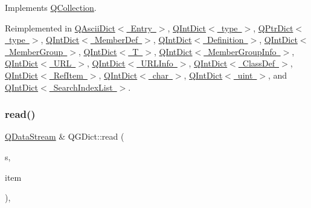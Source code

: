 Implements \mbox{\hyperlink{class_q_collection_a6441adbfb3ffb6f55ed834c0c0bcc6cb}{Q\+Collection}}.



Reimplemented in \mbox{\hyperlink{class_q_ascii_dict_a2241b13419dc0fcb6da3bcd159219404}{Q\+Ascii\+Dict$<$ Entry $>$}}, \mbox{\hyperlink{class_q_int_dict_acba9c2286ecaab46e0231e145ef5e471}{Q\+Int\+Dict$<$ type $>$}}, \mbox{\hyperlink{class_q_ptr_dict_a05675b8aa91387dd5cbb74eb881e17d1}{Q\+Ptr\+Dict$<$ type $>$}}, \mbox{\hyperlink{class_q_int_dict_acba9c2286ecaab46e0231e145ef5e471}{Q\+Int\+Dict$<$ Member\+Def $>$}}, \mbox{\hyperlink{class_q_int_dict_acba9c2286ecaab46e0231e145ef5e471}{Q\+Int\+Dict$<$ Definition $>$}}, \mbox{\hyperlink{class_q_int_dict_acba9c2286ecaab46e0231e145ef5e471}{Q\+Int\+Dict$<$ Member\+Group $>$}}, \mbox{\hyperlink{class_q_int_dict_acba9c2286ecaab46e0231e145ef5e471}{Q\+Int\+Dict$<$ T $>$}}, \mbox{\hyperlink{class_q_int_dict_acba9c2286ecaab46e0231e145ef5e471}{Q\+Int\+Dict$<$ Member\+Group\+Info $>$}}, \mbox{\hyperlink{class_q_int_dict_acba9c2286ecaab46e0231e145ef5e471}{Q\+Int\+Dict$<$ U\+R\+L $>$}}, \mbox{\hyperlink{class_q_int_dict_acba9c2286ecaab46e0231e145ef5e471}{Q\+Int\+Dict$<$ U\+R\+L\+Info $>$}}, \mbox{\hyperlink{class_q_int_dict_acba9c2286ecaab46e0231e145ef5e471}{Q\+Int\+Dict$<$ Class\+Def $>$}}, \mbox{\hyperlink{class_q_int_dict_acba9c2286ecaab46e0231e145ef5e471}{Q\+Int\+Dict$<$ Ref\+Item $>$}}, \mbox{\hyperlink{class_q_int_dict_acba9c2286ecaab46e0231e145ef5e471}{Q\+Int\+Dict$<$ char $>$}}, \mbox{\hyperlink{class_q_int_dict_acba9c2286ecaab46e0231e145ef5e471}{Q\+Int\+Dict$<$ uint $>$}}, and \mbox{\hyperlink{class_q_int_dict_acba9c2286ecaab46e0231e145ef5e471}{Q\+Int\+Dict$<$ Search\+Index\+List $>$}}.

\mbox{\label{class_q_g_dict_a236bd95bec134d7de77c0037b177ca8c}} 
\subsubsection{\texorpdfstring{read()}{read()}}
{\footnotesize\ttfamily \mbox{\hyperlink{class_q_data_stream}{Q\+Data\+Stream}} \& Q\+G\+Dict\+::read (\begin{DoxyParamCaption}\item[{\mbox{\hyperlink{class_q_data_stream}{Q\+Data\+Stream}} \&}]{s,  }\item[{Q\+Collection\+::\+Item \&}]{item }\end{DoxyParamCaption})\hspace{0.3cm}{\ttfamily [protected]}, {\ttfamily [virtual]}}

